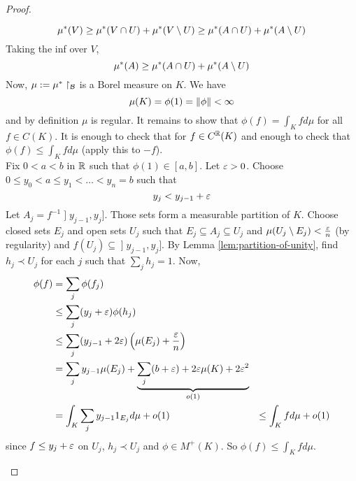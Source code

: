 \documentclass{article}
\begin{document}
\begin{proof}
\begin{itemize}
    $$\mu^*(V) \ge \mu^*(V \cap U) + \mu^*(V \setminus U) \ge \mu^*(A \cap U) + \mu^*(A \setminus U)$$
    Taking the inf over $V$,
    $$\mu^*(A) \ge \mu^*(A \cap U) + \mu^*(A \setminus U)$$
    Now, $\mu := \mu^*\restriction_{\mathcal B}$ is a Borel measure on $K$. We have
    $$\mu(K) = \phi(1) = \left\lVert \phi\right\rVert < \infty$$
    and by definition $\mu$ is regular. It remains to show that $\phi(f) = \int_K f d\mu$ for all $f \in C(K)$. It is enough to check that for $f \in C^\mathbb R(K)$ and enough to check that $\phi(f) \le \int_K f d\mu$ (apply this to $-f$). \\
    Fix $0 < a < b$ in $\mathbb R$ such that $\phi(1) \in [a, b]$. Let $\varepsilon > 0$. Choose $0 \le y_0 < a \le y_1 < \dots < y_n = b$ such that
    $$y_j < y_{j - 1} + \varepsilon$$
    Let $A_j = f^{-1}\mathopen]y_{j - 1}, y_j\mathclose]$. Those sets form a measurable partition of $K$. Choose closed sets $E_j$ and open sets $U_j$ such that $E_j \subseteq A_j \subseteq U_j$ and $\mu(U_j \setminus E_j) < \frac{\varepsilon} n$ (by regularity) and $f(U_j) \subseteq \mathopen]y_{j - 1}, y_j\mathclose]$. By Lemma \ref{lem:partition-of-unity}, find $h_j \prec U_j$ for each $j$ such that $\sum_j h_j = 1$. Now,
    \begin{align*}
      \phi(f)
      & = \sum_j \phi(f_j) \\
      & \le \sum_j (y_j + \varepsilon)\phi(h_j) \\
      & \le \sum_j (y_{j - 1} + 2\varepsilon)\left(\mu(E_j) + \frac{\varepsilon} n\right) \\
      & = \sum_j y_{j - 1}\mu(E_j) + \underbrace{\sum_j (b + \varepsilon) + 2\varepsilon\mu(K) + 2\varepsilon^2}_{o(1)} \\
      & = \int_K \sum_j y_{j - 1}1_{E_j} d\mu + o(1)
      & \le \int_K f d\mu + o(1)
    \end{align*}
    since $f \le y_j + \varepsilon$ on $U_j$, $h_j \prec U_j$ and $\phi \in M^+(K)$. So $\phi(f) \le \int_K f d\mu$.
  \end{itemize}
\end{proof}

\newlec
\end{document}
